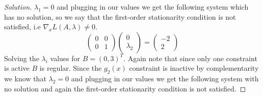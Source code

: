 \documentclass[12pt]{article}
\makeatletter
\theoremstyle{homework}
\newenvironment{exercise}[1]
{\def\@currentlabel{#1}\exercisecore}
{\endexercisecore}
\makeatother
\begin{document}
\begin{exercise}{P22}
\begin{enumerate}
\begin{proof}[Solution]
      $\lambda_1 = 0$ and plugging in our values we get the following system which has no solution, so we say that the first-order stationarity condition is not satisfied, 
      i.e $\nabla_x L(A, \lambda) \neq 0$. 
      \begin{equation*}
        \begin{pmatrix}
          0& 0\\
          0& 1
        \end{pmatrix}
        \begin{pmatrix}
          0\\
          \lambda_2
         \end{pmatrix}
          = 
          \begin{pmatrix}
            -2\\
            2
           \end{pmatrix}
      \end{equation*}
      Solving the $\lambda_i$ values for $B = (0, 3)^T$. Again note that since only one constraint is active $B$ is regular. Since the $g_2(x)$ constraint is inactive by complementarity we know that $\lambda_2 = 0$
      and plugging in our values we get the following system with no solution and again the first-order stationarity condition is not satisfied. 


\end{proof}
\end{enumerate}
\end{exercise}
\end{document}
